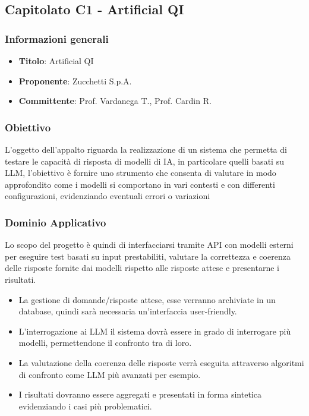 \subsection{Capitolato C1 - Artificial QI}
    \subsubsection{Informazioni generali}
        \begin{itemize}
            \item \textbf{Titolo}: Artificial QI
            \item \textbf{Proponente}: Zucchetti S.p.A.
            \item \textbf{Committente}: Prof. Vardanega T., Prof. Cardin R.
        \end{itemize}
     \subsubsection{Obiettivo}
    L’oggetto dell’appalto riguarda la realizzazione di un sistema che permetta di testare le capacità di risposta di modelli di IA, in particolare quelli basati su LLM, l’obiettivo è fornire uno strumento che consenta di valutare in modo approfondito come i modelli si comportano in vari contesti e con differenti configurazioni, evidenziando eventuali errori o variazioni

     \subsubsection{Dominio Applicativo}
    Lo scopo del progetto è quindi di interfacciarsi tramite API con modelli esterni per eseguire test basati su input prestabiliti, valutare la correttezza e coerenza delle risposte fornite dai modelli rispetto alle risposte attese e presentarne i risultati.
\begin{itemize}
    \item  La gestione di domande/risposte attese, esse verranno archiviate in un database, quindi sarà necessaria un’interfaccia user-friendly.
    \item  L’interrogazione ai LLM il sistema dovrà essere in grado di interrogare più modelli, permettendone il confronto tra di loro.
    \item  La valutazione della coerenza delle risposte verrà eseguita attraverso algoritmi di confronto come LLM più avanzati per esempio.
    \item I risultati dovranno essere aggregati e presentati in forma sintetica evidenziando i casi più problematici.
\end{itemize}
